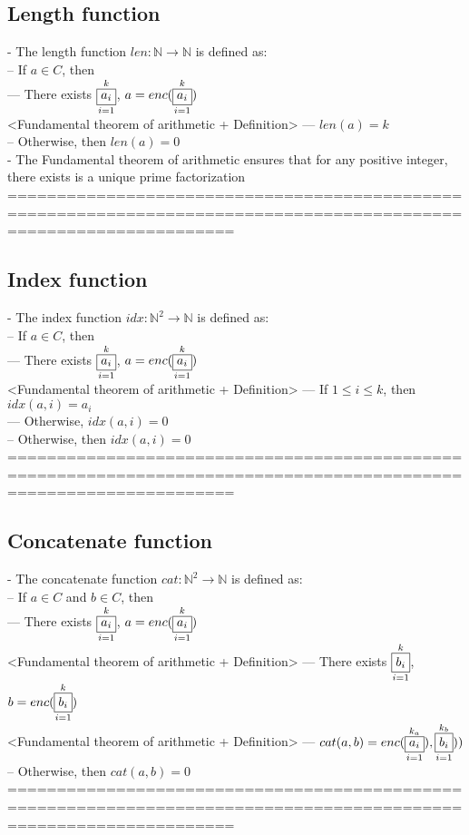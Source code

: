 \documentclass{book}
\newcommand{\vdc}[3]{\underset{#2}{\overset{#3}{\fbox{$#1$}}}}
\begin{document}
\subsection{Length function} %
	- The length function $len: \mathbb{N} \rightarrow \mathbb{N}$ is defined as: \\
		-- If $a \in C$, then \\
			--- There exists $\vdc{a_i}{i=1}{k}$, $a = enc(\vdc{a_i}{i=1}{k})$ \\ <Fundamental theorem of arithmetic + Definition>
			--- $len(a) = k$ \\
		-- Otherwise, then $len(a) = 0$ \\
	- The Fundamental theorem of arithmetic ensures that for any positive integer, there exists is a unique prime factorization \\
	===================================================================================================================
\subsection{Index function} %
	- The index function $idx: \mathbb{N}^2 \rightarrow \mathbb{N}$ is defined as: \\
		-- If $a \in C$, then \\
			--- There exists $\vdc{a_i}{i=1}{k}$, $a = enc(\vdc{a_i}{i=1}{k})$ \\ <Fundamental theorem of arithmetic + Definition>
			--- If $1 \leq i \leq k$, then $idx(a, i) = a_i$ \\
			--- Otherwise, $idx(a, i) = 0$ \\
		-- Otherwise, then $idx(a, i) = 0$ \\
	===================================================================================================================
\subsection{Concatenate function} %
	- The concatenate function $cat: \mathbb{N}^2 \rightarrow \mathbb{N}$ is defined as: \\
		-- If $a \in C$ and $b \in C$, then \\
			--- There exists $\vdc{a_i}{i=1}{k}$, $a = enc(\vdc{a_i}{i=1}{k})$ \\ <Fundamental theorem of arithmetic + Definition>
			--- There exists $\vdc{b_i}{i=1}{k}$, $b = enc(\vdc{b_i}{i=1}{k})$ \\ <Fundamental theorem of arithmetic + Definition>
			--- $cat(a, b) = enc(\vdc{a_i}{i=1}{k_a}), \vdc{b_i}{i=1}{k_b}))$ \\
		-- Otherwise, then $cat(a, b) = 0$ \\
	===================================================================================================================
\end{document}
